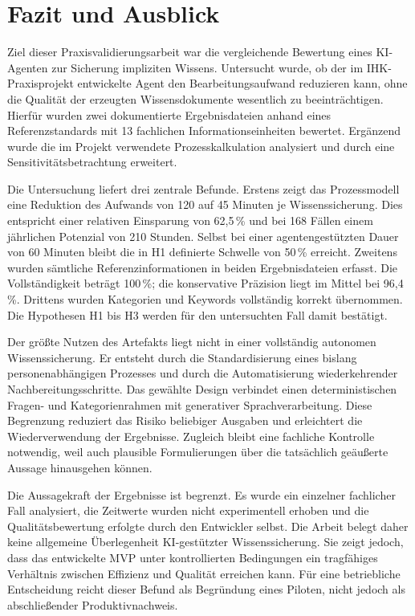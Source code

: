 \documentclass[
  10pt,
  ngerman,
  a4paper,
  toc=graduated,
  numbers=noenddot,
  headings=standardclasses,
  nonumberlist
]{scrartcl}
\newcommand{\pct}[1]{#1\,\%}
\begin{document}
\newpage
\section{Fazit und Ausblick}

Ziel dieser Praxisvalidierungsarbeit war die vergleichende Bewertung eines KI-Agenten zur Sicherung impliziten Wissens. Untersucht wurde, ob der im IHK-Praxisprojekt entwickelte Agent den Bearbeitungsaufwand reduzieren kann, ohne die Qualität der erzeugten Wissensdokumente wesentlich zu beeinträchtigen. Hierfür wurden zwei dokumentierte Ergebnisdateien anhand eines Referenzstandards mit 13 fachlichen Informationseinheiten bewertet. Ergänzend wurde die im Projekt verwendete Prozesskalkulation analysiert und durch eine Sensitivitätsbetrachtung erweitert.

Die Untersuchung liefert drei zentrale Befunde. Erstens zeigt das Prozessmodell eine Reduktion des Aufwands von 120 auf 45 Minuten je Wissenssicherung. Dies entspricht einer relativen Einsparung von \pct{62{,}5} und bei 168 Fällen einem jährlichen Potenzial von 210 Stunden. Selbst bei einer agentengestützten Dauer von 60 Minuten bleibt die in H1 definierte Schwelle von \pct{50} erreicht. Zweitens wurden sämtliche Referenzinformationen in beiden Ergebnisdateien erfasst. Die Vollständigkeit beträgt \pct{100}; die konservative Präzision liegt im Mittel bei \pct{96{,}4}. Drittens wurden Kategorien und Keywords vollständig korrekt übernommen. Die Hypothesen H1 bis H3 werden für den untersuchten Fall damit bestätigt.

Der größte Nutzen des Artefakts liegt nicht in einer vollständig autonomen Wissenssicherung. Er entsteht durch die Standardisierung eines bislang personenabhängigen Prozesses und durch die Automatisierung wiederkehrender Nachbereitungsschritte. Das gewählte Design verbindet einen deterministischen Fragen- und Kategorienrahmen mit generativer Sprachverarbeitung. Diese Begrenzung reduziert das Risiko beliebiger Ausgaben und erleichtert die Wiederverwendung der Ergebnisse. Zugleich bleibt eine fachliche Kontrolle notwendig, weil auch plausible Formulierungen über die tatsächlich geäußerte Aussage hinausgehen können.

Die Aussagekraft der Ergebnisse ist begrenzt. Es wurde ein einzelner fachlicher Fall analysiert, die Zeitwerte wurden nicht experimentell erhoben und die Qualitätsbewertung erfolgte durch den Entwickler selbst. Die Arbeit belegt daher keine allgemeine Überlegenheit KI-gestützter Wissenssicherung. Sie zeigt jedoch, dass das entwickelte MVP unter kontrollierten Bedingungen ein tragfähiges Verhältnis zwischen Effizienz und Qualität erreichen kann. Für eine betriebliche Entscheidung reicht dieser Befund als Begründung eines Piloten, nicht jedoch als abschließender Produktivnachweis.
\end{document}
